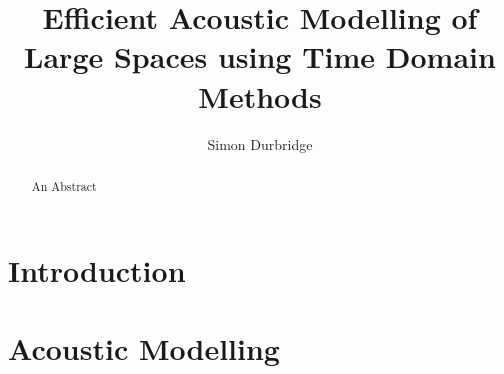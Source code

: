 \documentclass{svproc}
\title{Efficient Acoustic Modelling of Large Spaces using Time Domain Methods} %
\author{Simon Durbridge} %
\institute{Dept. Engineering, Mathematics \&\ Computing\\ University of Derby\\
\email{s.durbridge1@unimail.derby.ac.uk} %
} %
\begin{document}
\maketitle %


\begin{abstract}
An Abstract


\end{abstract}










\section{Introduction}
 


\newpage

\section{Acoustic Modelling}
\end{document}
